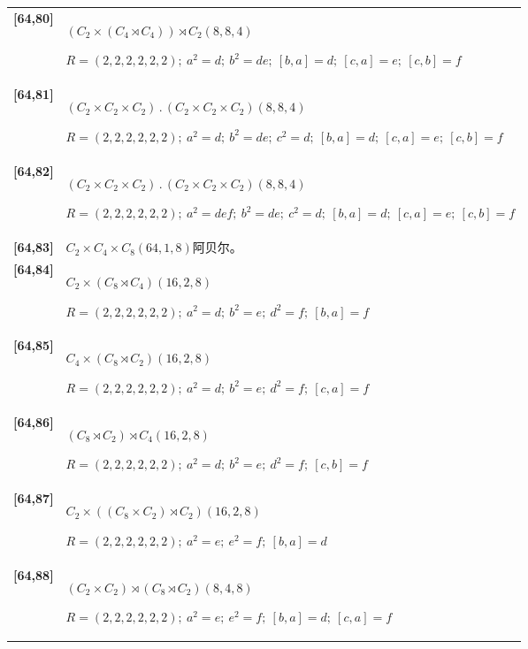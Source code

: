 \documentclass[UTF8,fontset=fandol,11pt,a4paper]{ctexart}
\begin{document}
\begin{longtable}{@{}p{17mm}>{\raggedright\arraybackslash}p{141mm}@{}}
\textbf{[64,80]} & $(C_{2}\times (C_{4}\rtimes C_{4}))\rtimes C_{2}$\quad $(8,8,4)$\par\(R=(2,2,2,2,2,2);\allowbreak\ a^{2}=d;\allowbreak\ b^{2}=de;\allowbreak\ [b,a]=d;\allowbreak\ [c,a]=e;\allowbreak\ [c,b]=f\)\\[3pt]

\textbf{[64,81]} & $(C_{2}\times C_{2}\times C_{2})\mathbin{.} (C_{2}\times C_{2}\times C_{2})$\quad $(8,8,4)$\par\(R=(2,2,2,2,2,2);\allowbreak\ a^{2}=d;\allowbreak\ b^{2}=de;\allowbreak\ c^{2}=d;\allowbreak\ [b,a]=d;\allowbreak\ [c,a]=e;\allowbreak\ [c,b]=f\)\\[3pt]

\textbf{[64,82]} & $(C_{2}\times C_{2}\times C_{2})\mathbin{.} (C_{2}\times C_{2}\times C_{2})$\quad $(8,8,4)$\par\(R=(2,2,2,2,2,2);\allowbreak\ a^{2}=def;\allowbreak\ b^{2}=de;\allowbreak\ c^{2}=d;\allowbreak\ [b,a]=d;\allowbreak\ [c,a]=e;\allowbreak\ [c,b]=f\)\\[3pt]

\textbf{[64,83]} & $C_{2}\times C_{4}\times C_{8}$\quad $(64,1,8)$\quad 阿贝尔。\\[3pt]

\textbf{[64,84]} & $C_{2}\times (C_{8}\rtimes C_{4})$\quad $(16,2,8)$\par\(R=(2,2,2,2,2,2);\allowbreak\ a^{2}=d;\allowbreak\ b^{2}=e;\allowbreak\ d^{2}=f;\allowbreak\ [b,a]=f\)\\[3pt]

\textbf{[64,85]} & $C_{4}\times (C_{8}\rtimes C_{2})$\quad $(16,2,8)$\par\(R=(2,2,2,2,2,2);\allowbreak\ a^{2}=d;\allowbreak\ b^{2}=e;\allowbreak\ d^{2}=f;\allowbreak\ [c,a]=f\)\\[3pt]

\textbf{[64,86]} & $(C_{8}\rtimes C_{2})\rtimes C_{4}$\quad $(16,2,8)$\par\(R=(2,2,2,2,2,2);\allowbreak\ a^{2}=d;\allowbreak\ b^{2}=e;\allowbreak\ d^{2}=f;\allowbreak\ [c,b]=f\)\\[3pt]

\textbf{[64,87]} & $C_{2}\times ((C_{8}\times C_{2})\rtimes C_{2})$\quad $(16,2,8)$\par\(R=(2,2,2,2,2,2);\allowbreak\ a^{2}=e;\allowbreak\ e^{2}=f;\allowbreak\ [b,a]=d\)\\[3pt]

\textbf{[64,88]} & $(C_{2}\times C_{2})\rtimes (C_{8}\rtimes C_{2})$\quad $(8,4,8)$\par\(R=(2,2,2,2,2,2);\allowbreak\ a^{2}=e;\allowbreak\ e^{2}=f;\allowbreak\ [b,a]=d;\allowbreak\ [c,a]=f\)\\[3pt]


\end{longtable}
\end{document}
